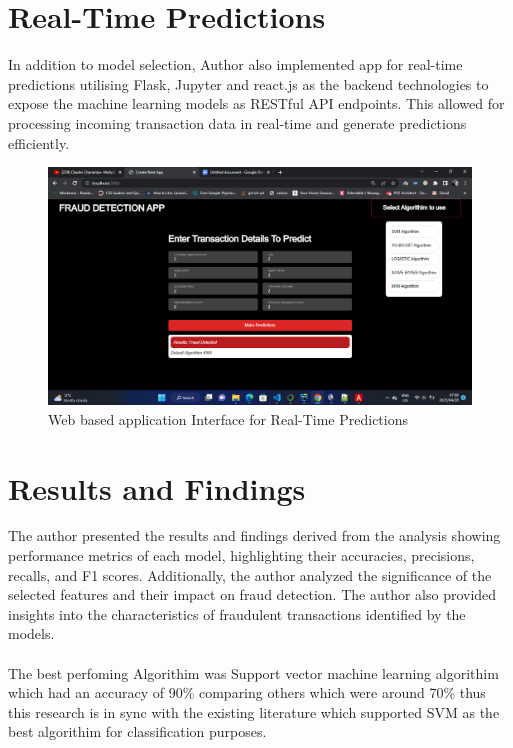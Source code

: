 \section{Real-Time Predictions}
In addition to model selection, Author also implemented app for real-time predictions utilising Flask, Jupyter and 
react.js as the backend technologies to expose the machine learning models as RESTful API endpoints. This 
allowed for processing incoming transaction data in real-time and generate predictions efficiently.\\ 

\begin{figure}[h]
    \centering
    \includegraphics[width=1\linewidth]{image23}
    \caption{Web based application Interface for Real-Time Predictions}
    \label{fig:Web based application Interface for Real-Time Predictions}
\end{figure}

\section{Results and Findings}
The author presented the results and findings derived from the analysis showing performance metrics 
of each model, highlighting their accuracies, precisions, recalls, and F1 scores. Additionally, the author analyzed the 
significance of the selected features and their impact on fraud detection. The author also provided insights into the 
characteristics of fraudulent transactions identified by the models.\\\\
The best perfoming Algorithim was Support vector machine learning algorithim which had an accuracy of 90\% comparing others which were around 70\%
thus this research is in sync with the existing literature which supported SVM as the best algorithim for classification purposes.

